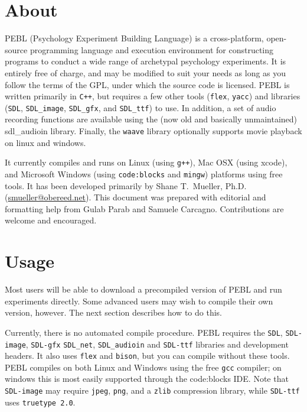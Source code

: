 \chapter{About}

PEBL (Psychology Experiment Building Language) is a cross-platform,
open-source programming language and execution environment for
constructing programs to conduct a wide range of archetypal psychology
experiments. It is entirely free of charge, and may be modified to
suit your needs as long as you follow the terms of the GPL, under
which the source code is licensed. PEBL is written primarily in
\texttt{C++}, but requires a few other tools (\texttt{flex},
\texttt{yacc}) and libraries (\texttt{SDL}, \texttt{SDL\_image},
\texttt{SDL\_gfx}, and \texttt{SDL\_ttf}) to use.  In addition, a set
of audio recording functions are available using the (now old and
basically unmaintained) sdl\_audioin library.  Finally, the
\texttt{waave} library optionally supports movie playback on linux and
windows.


It currently compiles and runs on Linux (using \texttt{g++}), Mac OSX
(using xcode), and Microsoft Windows (using \texttt{code:blocks} and
\texttt{mingw}) platforms using free tools. It has been developed
primarily by Shane T.~Mueller,
Ph.D. (\href{mailto:smueller@obereed.net}{smueller@obereed.net}). This
document was prepared with editorial and formatting help from Gulab
Parab and Samuele Carcagno. Contributions are welcome and encouraged.

\chapter{Usage}
Most users will be able to download a precompiled version of PEBL and
run experiments directly. Some advanced users may wish to compile
their own version, however.  The next section describes how to do this.


Currently, there is no automated compile procedure.  PEBL requires the
\texttt{SDL}, \texttt{SDL-image}, \texttt{SDL-gfx} \texttt{SDL\_net},
 \texttt{SDL\_audioin} and
\texttt{SDL-ttf} libraries and development headers.  It also uses
\texttt{flex} and \texttt{bison}, but you can compile without these
tools. PEBL compiles on both Linux and Windows using the free
\texttt{gcc} compiler; on windows this is most easily supported through the code:blocks IDE. Note that \texttt{SDL-image} may require
\texttt{jpeg}, \texttt{png}, and a \texttt{zlib} compression library,
while \texttt{SDL-ttf} uses \texttt{truetype 2.0}.

